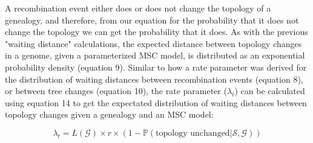 \documentclass[11pt]{article}
\begin{document}
A recombination event either does or does not change the topology
of a genealogy, and therefore, from our equation for the probability that 
it does not change the topology we can get the probability that it does. 
As with the previous "waiting distance" calculations, the expected distance
between topology changes in a genome, given a parameterized MSC model, 
is distributed as an exponential probability density (equation 9). 
Similar to how a rate parameter was derived for the distribution 
of waiting distances between recombination events (equation 8), 
or between tree changes (equation 10), 
the rate parameter ($\lambda_t$) can be calculated using equation 14 
to get the expectated distribution of waiting distances between topology 
changes given a genealogy and an MSC model:

\begin{equation}
	\lambda_{t} = 
	L(\mathcal{G}) \times r \times 
	(1 - \mathbb{P}(\text{topology unchanged} | \mathcal{S},\mathcal{G}))
\end{equation}
\end{document}
